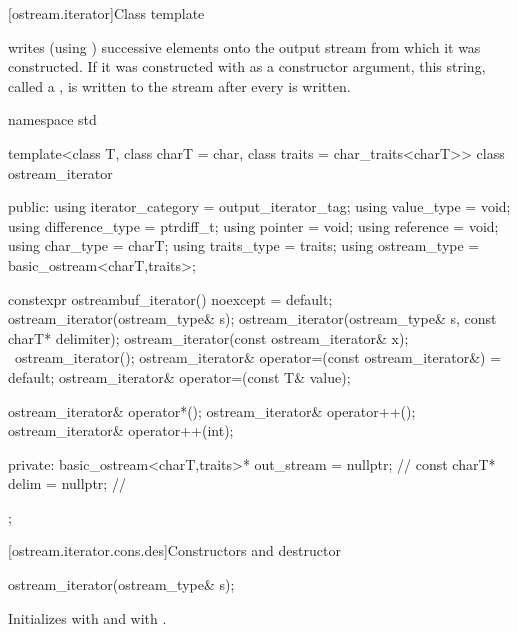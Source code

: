 \begin{itemdescr}
\pnum
\returns
{}
\end{itemdescr}

[ostream.iterator]{Class template }

\pnum
{}%
writes (using
)
successive elements onto the output stream from which it was constructed.
If it was constructed with
as a constructor argument, this string, called a
,
is written to the stream after every
is written.

\begin{codeblock}
namespace std {
  template<class T, class charT = char, class traits = char_traits<charT>>
  class ostream_iterator {
  public:
    using iterator_category = output_iterator_tag;
    using value_type        = void;
    using difference_type   = ptrdiff_t;
    using pointer           = void;
    using reference         = void;
    using char_type         = charT;
    using traits_type       = traits;
    using ostream_type      = basic_ostream<charT,traits>;

    constexpr ostreambuf_iterator() noexcept = default;
    ostream_iterator(ostream_type& s);
    ostream_iterator(ostream_type& s, const charT* delimiter);
    ostream_iterator(const ostream_iterator& x);
    ~ostream_iterator();
    ostream_iterator& operator=(const ostream_iterator&) = default;
    ostream_iterator& operator=(const T& value);

    ostream_iterator& operator*();
    ostream_iterator& operator++();
    ostream_iterator& operator++(int);

  private:
    basic_ostream<charT,traits>* out_stream = nullptr;          // \expos
    const charT* delim = nullptr;                               // \expos
  };
}
\end{codeblock}

[ostream.iterator.cons.des]{Constructors and destructor}

%
\begin{itemdecl}
ostream_iterator(ostream_type& s);
\end{itemdecl}

\begin{itemdescr}
\pnum
\effects
Initializes  with  and
 with .
\end{itemdescr}



